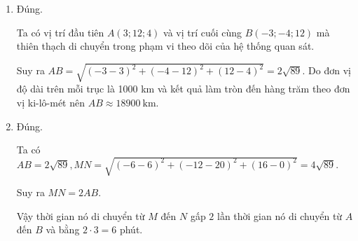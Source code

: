 \begin{ex}
{\begin{enumerate}
		Theo đề bài ta có phạm vi theo dõi của hệ thống quan sát là mặt cầu $(O)$ có phương trình
		$$
		x^2+y^2+z^2=13^2.
		$$
		
		Vì $A, B$ thuộc đường thẳng $MN$ nên $A(6+3a; 20+8a;-4a)$, $B(6+3b; 20+8b;-4b) a, b \in \mathbb{R}$. Hơn nữa $A$, $B$ thuộc mặt cầu $(O)$ nên $a$, $b$ là hai nghiệm của phương trình.
		$$
		\begin{aligned}
			& (6+3 t)^2+(20+8 t)^2+(-4 t)^2=13^2 \\
			\Leftrightarrow	& 89 t^2+356 t-267=0 \\
			\Leftrightarrow	& {\left[\begin{array}{l}
				t=-1 \\
				t=-3.
			\end{array}\right.}
		\end{aligned}
		$$
		
		Suy ra $A(3; 12; 4)$ và $B(-3;-4; 12)$ hoặc $A(-3;-4; 12)$ và $B(3; 12; 4)$.
		
		Do $MA< MB$ nên $A(3; 12; 4)$ (trong trường hợp này thì $MA=\sqrt{89} < \sqrt{801}=MB)$.
		Vậy điểm gặp đầu tiên là $A(3; 12; 4)$.
		\item Đúng.
		
		Ta có vị trí đầu tiên $A(3; 12; 4)$ và vị trí cuối cùng $B(-3;-4; 12)$ mà thiên thạch di chuyển trong phạm vi theo dõi của hệ thống quan sát.
		
		Suy ra $AB=\sqrt{(-3-3)^2+(-4-12)^2+(12-4)^2}=2\sqrt{89}$.
		Do đơn vị độ dài trên mỗi trục là 1000 km và kết quả làm tròn đến hàng trăm theo đơn vị ki-lô-mét nên $AB\approx 18900\mathrm{~km}$.
		
		\item Đúng.
		
		Ta có $AB=2\sqrt{89}, MN=\sqrt{(-6-6)^2+(-12-20)^2+(16-0)^2}=4\sqrt{89}$.
		
		Suy ra $MN=2AB$.
		
		Vậy thời gian nó di chuyển từ $M$ đến $N$ gấp $2$ lần thời gian nó di chuyển từ $A$ đến $B$ và bằng $2\cdot 3=6$ phút.
	\end{enumerate}
	}
\end{ex}

